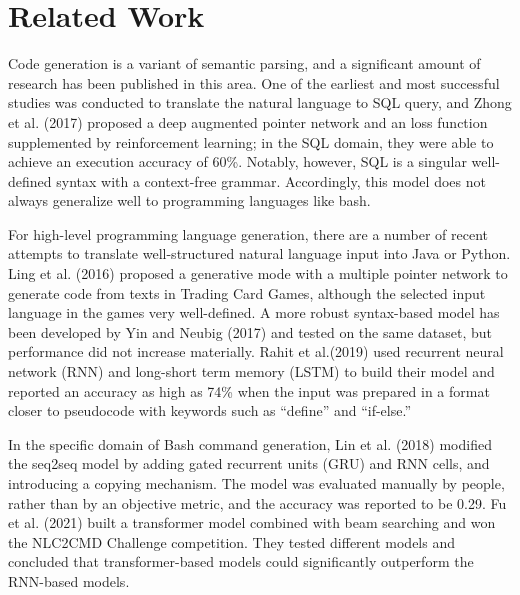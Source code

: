 \section{Related Work}
Code generation is a variant of semantic parsing, and a significant amount of
research has been published in this area. One of the earliest and most
successful studies was conducted to translate the natural language to SQL
query, and Zhong et al. (2017) \cite{zhong2017seq2sql} proposed a deep
augmented pointer network and an loss function supplemented by reinforcement
learning; in the SQL domain, they were able to achieve an execution accuracy of
60\%. Notably, however, SQL is a singular well-defined syntax with a
context-free grammar. Accordingly, this model does not always generalize well
to programming languages like bash.
\par
For high-level programming language generation, there are a number of recent
attempts to translate well-structured natural language input into Java or
Python.  Ling et al. (2016) \cite{ling2016latent} proposed a generative mode
with a multiple pointer network to generate code from texts in Trading Card
Games, although the selected input language in the games very well-defined. A
more robust syntax-based model has been developed by Yin and Neubig (2017)
\cite{yin2017syntactic} and tested on the same dataset, but performance did not
increase materially. Rahit et al.(2019) \cite{rahit2019machine} used recurrent
neural network (RNN) and long-short term memory (LSTM) to build their model and
reported an accuracy as high as 74\% when the input was prepared in a format
closer to pseudocode with keywords such as ``define'' and ``if-else.''
\par
In the specific domain of Bash command generation, Lin et al. (2018)
\cite{lin2018nl2bash} modified the seq2seq model by adding gated recurrent
units (GRU) and RNN cells, and introducing a copying mechanism. The model was
evaluated manually by people, rather than by an objective metric, and the
accuracy was reported to be 0.29. Fu et al. (2021) \cite{Fu2021ATransform}
built a transformer model combined with beam searching and won the NLC2CMD
Challenge competition. They tested different models and concluded that
transformer-based models could significantly outperform the RNN-based models.
